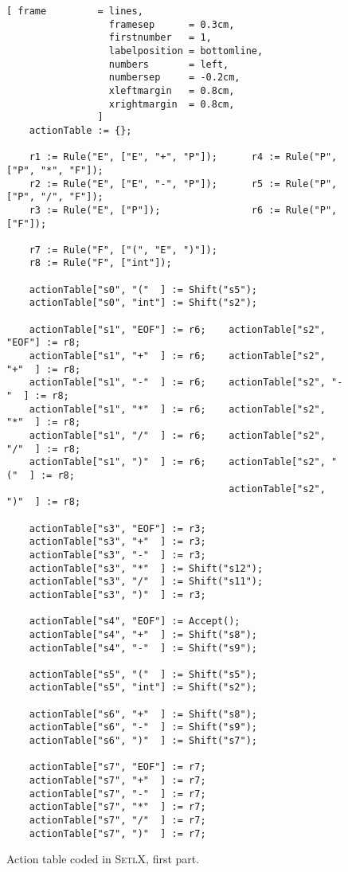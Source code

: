\begin{figure}[!ht]
\centering
\begin{Verbatim}[ frame         = lines, 
                  framesep      = 0.3cm, 
                  firstnumber   = 1,
                  labelposition = bottomline,
                  numbers       = left,
                  numbersep     = -0.2cm,
                  xleftmargin   = 0.8cm,
                  xrightmargin  = 0.8cm,
                ]
    actionTable := {};
    
    r1 := Rule("E", ["E", "+", "P"]);      r4 := Rule("P", ["P", "*", "F"]);
    r2 := Rule("E", ["E", "-", "P"]);      r5 := Rule("P", ["P", "/", "F"]);
    r3 := Rule("E", ["P"]);                r6 := Rule("P", ["F"]);          
      
    r7 := Rule("F", ["(", "E", ")"]);
    r8 := Rule("F", ["int"]);
    
    actionTable["s0", "("  ] := Shift("s5");
    actionTable["s0", "int"] := Shift("s2");
    
    actionTable["s1", "EOF"] := r6;    actionTable["s2", "EOF"] := r8;
    actionTable["s1", "+"  ] := r6;    actionTable["s2", "+"  ] := r8;
    actionTable["s1", "-"  ] := r6;    actionTable["s2", "-"  ] := r8;
    actionTable["s1", "*"  ] := r6;    actionTable["s2", "*"  ] := r8;
    actionTable["s1", "/"  ] := r6;    actionTable["s2", "/"  ] := r8;
    actionTable["s1", ")"  ] := r6;    actionTable["s2", "("  ] := r8;
                                       actionTable["s2", ")"  ] := r8;

    actionTable["s3", "EOF"] := r3;
    actionTable["s3", "+"  ] := r3;
    actionTable["s3", "-"  ] := r3;
    actionTable["s3", "*"  ] := Shift("s12");
    actionTable["s3", "/"  ] := Shift("s11");
    actionTable["s3", ")"  ] := r3;
    
    actionTable["s4", "EOF"] := Accept();
    actionTable["s4", "+"  ] := Shift("s8");
    actionTable["s4", "-"  ] := Shift("s9");
    
    actionTable["s5", "("  ] := Shift("s5");
    actionTable["s5", "int"] := Shift("s2");
    
    actionTable["s6", "+"  ] := Shift("s8");
    actionTable["s6", "-"  ] := Shift("s9");
    actionTable["s6", ")"  ] := Shift("s7");
    
    actionTable["s7", "EOF"] := r7;
    actionTable["s7", "+"  ] := r7;
    actionTable["s7", "-"  ] := r7;
    actionTable["s7", "*"  ] := r7;
    actionTable["s7", "/"  ] := r7;
    actionTable["s7", ")"  ] := r7;   
\end{Verbatim}
\vspace*{-0.3cm}
\caption{Action table coded in \textsc{SetlX}, first part.}
\label{fig:parse-table.stlx:action1}
\end{figure}


